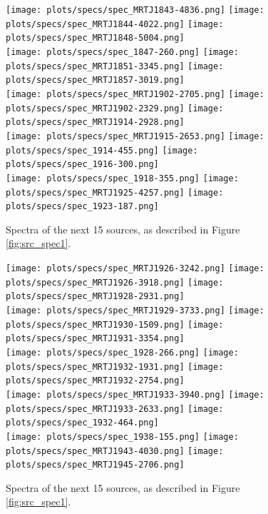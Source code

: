 \documentclass[preprint]{aastex}
\begin{document}
\begin{figure}\centering
\texttt{[image: plots/specs/spec\_MRTJ1843-4836.png]}
\texttt{[image: plots/specs/spec\_MRTJ1844-4022.png]}
\texttt{[image: plots/specs/spec\_MRTJ1848-5004.png]}\\
\texttt{[image: plots/specs/spec\_1847-260.png]}
\texttt{[image: plots/specs/spec\_MRTJ1851-3345.png]}
\texttt{[image: plots/specs/spec\_MRTJ1857-3019.png]}\\
\texttt{[image: plots/specs/spec\_MRTJ1902-2705.png]}
\texttt{[image: plots/specs/spec\_MRTJ1902-2329.png]}
\texttt{[image: plots/specs/spec\_MRTJ1914-2928.png]}\\
\texttt{[image: plots/specs/spec\_MRTJ1915-2653.png]}
\texttt{[image: plots/specs/spec\_1914-455.png]}
\texttt{[image: plots/specs/spec\_1916-300.png]}\\
\texttt{[image: plots/specs/spec\_1918-355.png]}
\texttt{[image: plots/specs/spec\_MRTJ1925-4257.png]}
\texttt{[image: plots/specs/spec\_1923-187.png]}\\
\caption{Spectra of the next 15 sources, as described in Figure \ref{fig:src_spec1}.
}\label{fig:src_spec24}
\end{figure}\clearpage

\begin{figure}\centering
\texttt{[image: plots/specs/spec\_MRTJ1926-3242.png]}
\texttt{[image: plots/specs/spec\_MRTJ1926-3918.png]}
\texttt{[image: plots/specs/spec\_MRTJ1928-2931.png]}\\
\texttt{[image: plots/specs/spec\_MRTJ1929-3733.png]}
\texttt{[image: plots/specs/spec\_MRTJ1930-1509.png]}
\texttt{[image: plots/specs/spec\_MRTJ1931-3354.png]}\\
\texttt{[image: plots/specs/spec\_1928-266.png]}
\texttt{[image: plots/specs/spec\_MRTJ1932-1931.png]}
\texttt{[image: plots/specs/spec\_MRTJ1932-2754.png]}\\
\texttt{[image: plots/specs/spec\_MRTJ1933-3940.png]}
\texttt{[image: plots/specs/spec\_MRTJ1933-2633.png]}
\texttt{[image: plots/specs/spec\_1932-464.png]}\\
\texttt{[image: plots/specs/spec\_1938-155.png]}
\texttt{[image: plots/specs/spec\_MRTJ1943-4030.png]}
\texttt{[image: plots/specs/spec\_MRTJ1945-2706.png]}\\
\caption{Spectra of the next 15 sources, as described in Figure \ref{fig:src_spec1}.
}\label{fig:src_spec25}
\end{figure}\clearpage
\end{document}

